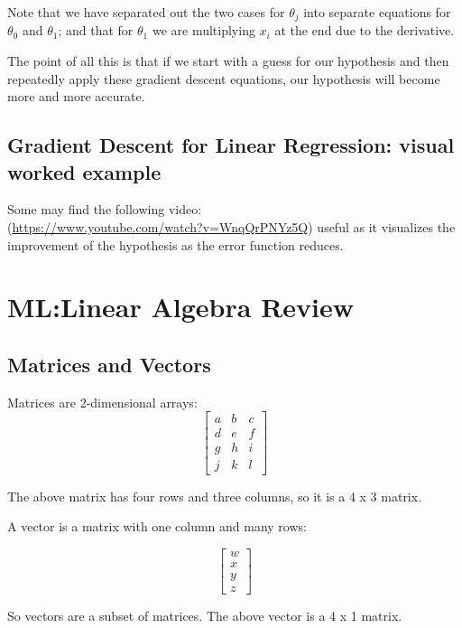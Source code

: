 \documentclass{article}
\begin{document}
Note that we have separated out the two cases for $\theta_j$ into separate equations for $\theta_0$ and $\theta_1$; and that for $\theta_1$ we are multiplying $x_{i}$ at the end due to the derivative.

The point of all this is that if we start with a guess for our hypothesis and then repeatedly apply these gradient descent equations, our hypothesis will become more and more accurate.

\subsection{Gradient Descent for Linear Regression: visual worked example}
Some may find the following video: \\ (\url{https://www.youtube.com/watch?v=WnqQrPNYz5Q}) useful as it visualizes the improvement of the hypothesis as the error function reduces.


\section{ML:Linear Algebra Review}
\subsection{Matrices and Vectors}
Matrices are 2-dimensional arrays:
$$\begin{bmatrix}  a & b & c \\   d & e & f \\   g & h & i \\   j & k & l\end{bmatrix}$$

The above matrix has four rows and three columns, so it is a 4 x 3 matrix.

A vector is a matrix with one column and many rows:

$$\begin{bmatrix}  w \\  x \\  y \\  z \end{bmatrix}$$

So vectors are a subset of matrices. The above vector is a 4 x 1 matrix.
\end{document}
